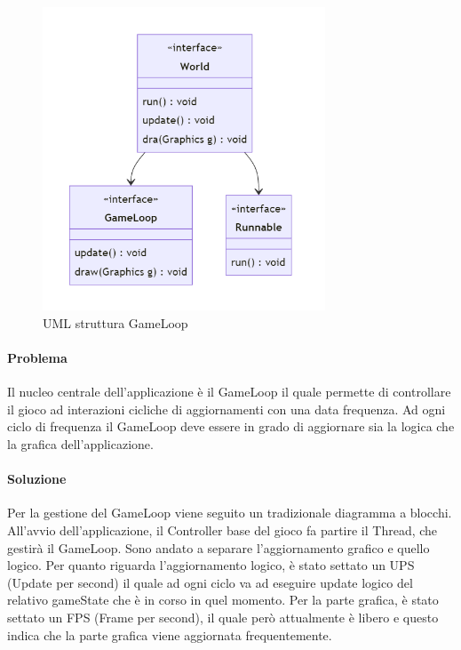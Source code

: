 \documentclass[a4paper,12pt]{report}
\begin{document}
\begin{figure}[H]
    \centering{}
    \includegraphics[width=0.75\textwidth]{img/UMLGameLoop.png}
    \caption{UML struttura GameLoop}
\end{figure}

\paragraph{Problema} Il nucleo centrale dell’applicazione è il GameLoop il quale permette di controllare il gioco ad interazioni cicliche di aggiornamenti con una data frequenza. Ad ogni ciclo di frequenza il GameLoop deve essere in grado di aggiornare sia la logica che la grafica dell’applicazione.

\paragraph{Soluzione} Per la gestione del GameLoop viene seguito un tradizionale diagramma a blocchi. All’avvio dell’applicazione, il Controller base del gioco fa partire il Thread, che gestirà il GameLoop. Sono andato a separare l’aggiornamento grafico e quello logico. Per quanto riguarda l'aggiornamento logico, è stato settato un UPS (Update per second) il quale ad ogni ciclo va ad eseguire update logico del relativo gameState che è in corso in quel momento. Per la parte grafica, è stato settato un FPS (Frame per second), il quale però attualmente è libero e questo indica che la parte grafica viene aggiornata frequentemente.
\end{document}
